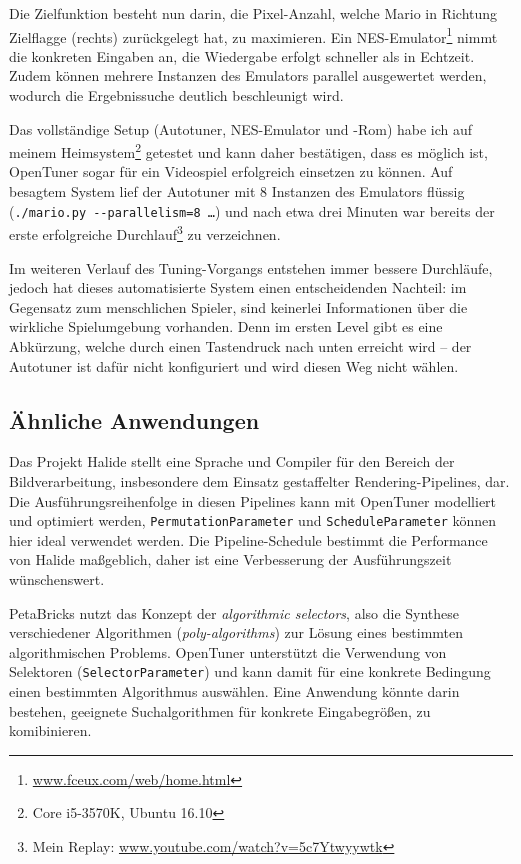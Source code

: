 \documentclass[a4paper,11pt]{scrartcl}
\begin{document}
Die Zielfunktion besteht nun darin, die Pixel-Anzahl, welche Mario in Richtung Zielflagge (rechts)
zurückgelegt hat, zu maximieren. Ein NES-Emulator\footnote{\url{www.fceux.com/web/home.html}}
nimmt die konkreten Eingaben an, die Wiedergabe erfolgt schneller als in Echtzeit. Zudem können
mehrere Instanzen des Emulators parallel ausgewertet werden, wodurch die Ergebnissuche 
deutlich beschleunigt wird. \newline

Das vollständige Setup (Autotuner, NES-Emulator und -Rom) habe ich auf meinem 
Heimsystem\footnote{Core i5-3570K, Ubuntu 16.10} getestet und kann daher 
bestätigen, dass es möglich ist, OpenTuner sogar für ein Videospiel erfolgreich
einsetzen zu können. Auf besagtem System lief der Autotuner mit 8 Instanzen des
Emulators flüssig (\texttt{./mario.py -{}-parallelism=8 \ldots}) und nach etwa drei Minuten
war bereits der erste erfolgreiche Durchlauf\footnote{Mein Replay: \url{www.youtube.com/watch?v=5c7Ytwyywtk}} zu verzeichnen. \newline

Im weiteren Verlauf des Tuning-Vorgangs entstehen immer bessere Durchläufe, jedoch
hat dieses automatisierte System einen entscheidenden Nachteil: im Gegensatz zum menschlichen
Spieler, sind keinerlei Informationen über die wirkliche Spielumgebung vorhanden.
Denn im ersten Level gibt es eine Abkürzung, welche durch einen Tastendruck nach 
unten erreicht wird -- der Autotuner ist dafür nicht konfiguriert und wird diesen Weg
nicht wählen.


\subsection{Ähnliche Anwendungen}
Das Projekt Halide \cite{halide} stellt eine Sprache und Compiler für den Bereich der 
Bildverarbeitung, insbesondere dem Einsatz gestaffelter Rendering-Pipelines, dar.
Die Ausführungsreihenfolge in diesen Pipelines kann mit OpenTuner modelliert und 
optimiert werden, \texttt{PermutationParameter} und \texttt{ScheduleParameter}
können hier ideal verwendet werden. Die Pipeline-Schedule bestimmt die Performance
von Halide maßgeblich, daher ist eine Verbesserung der Ausführungszeit wünschenswert. \newline

PetaBricks \cite{petab} nutzt das Konzept der \emph{algorithmic selectors}, also die 
Synthese verschiedener Algorithmen (\emph{poly-algorithms}) zur Lösung eines bestimmten algorithmischen Problems.
OpenTuner unterstützt die Verwendung von Selektoren (\texttt{SelectorParameter})
und kann damit für eine konkrete Bedingung einen bestimmten Algorithmus auswählen. 
Eine Anwendung könnte darin bestehen, geeignete Suchalgorithmen für konkrete
Eingabegrößen, zu komibinieren.
\end{document}
